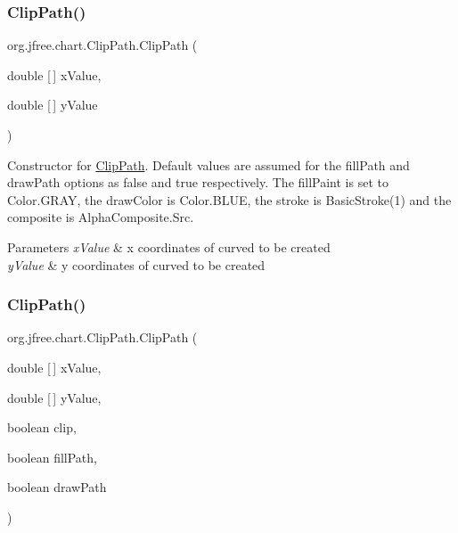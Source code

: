 \subsubsection{\texorpdfstring{Clip\+Path()}{ClipPath()}\hspace{0.1cm}{\footnotesize\ttfamily [2/4]}}
{\footnotesize\ttfamily org.\+jfree.\+chart.\+Clip\+Path.\+Clip\+Path (\begin{DoxyParamCaption}\item[{double \mbox{[}$\,$\mbox{]}}]{x\+Value,  }\item[{double \mbox{[}$\,$\mbox{]}}]{y\+Value }\end{DoxyParamCaption})}

Constructor for \mbox{\hyperlink{classorg_1_1jfree_1_1chart_1_1_clip_path}{Clip\+Path}}. Default values are assumed for the fill\+Path and draw\+Path options as false and true respectively. The fill\+Paint is set to Color.\+G\+R\+AY, the draw\+Color is Color.\+B\+L\+UE, the stroke is Basic\+Stroke(1) and the composite is Alpha\+Composite.\+Src.


\begin{DoxyParams}{Parameters}
{\em x\+Value} & x coordinates of curved to be created \\
\hline
{\em y\+Value} & y coordinates of curved to be created \\
\hline
\end{DoxyParams}
\mbox{\label{classorg_1_1jfree_1_1chart_1_1_clip_path_a81cb5c0f92d313e2a0754c300260f070}} 
\subsubsection{\texorpdfstring{Clip\+Path()}{ClipPath()}\hspace{0.1cm}{\footnotesize\ttfamily [3/4]}}
{\footnotesize\ttfamily org.\+jfree.\+chart.\+Clip\+Path.\+Clip\+Path (\begin{DoxyParamCaption}\item[{double \mbox{[}$\,$\mbox{]}}]{x\+Value,  }\item[{double \mbox{[}$\,$\mbox{]}}]{y\+Value,  }\item[{boolean}]{clip,  }\item[{boolean}]{fill\+Path,  }\item[{boolean}]{draw\+Path }\end{DoxyParamCaption})}

